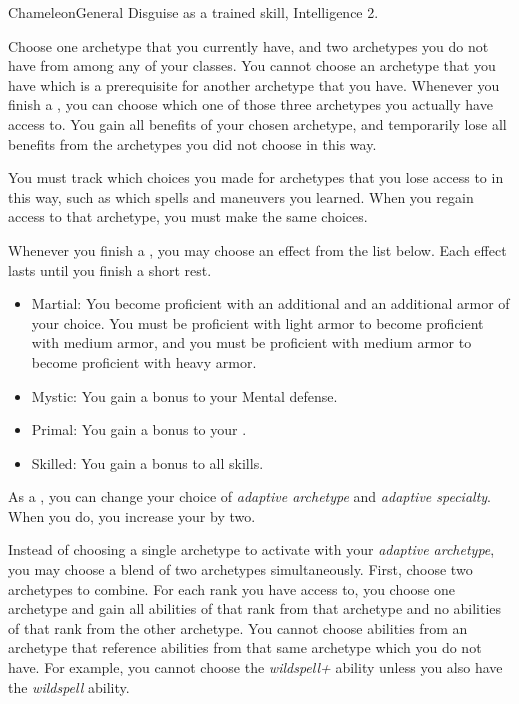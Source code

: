     \begin{feat}{Chameleon}{General}
        \featpre Disguise as a trained skill, Intelligence 2.

         Choose one archetype that you currently have, and two archetypes you do not have from among any of your classes.
        You cannot choose an archetype that you have which is a prerequisite for another archetype that you have.
        Whenever you finish a , you can choose which one of those three archetypes you actually have access to.
        You gain all benefits of your chosen archetype, and temporarily lose all benefits from the archetypes you did not choose in this way.

        You must track which choices you made for archetypes that you lose access to in this way, such as which spells and maneuvers you learned.
        When you regain access to that archetype, you must make the same choices.

         Whenever you finish a , you may choose an effect from the list below.
        Each effect lasts until you finish a short rest.
        \begin{itemize}
            \item Martial: You become proficient with an additional  and an additional armor  of your choice.
                You must be proficient with light armor to become proficient with medium armor, and you must be proficient with medium armor to become proficient with heavy armor.
            \item Mystic: You gain a  bonus to your Mental defense.
            \item Primal: You gain a  bonus to your .
            \item Skilled: You gain a  bonus to all skills.
        \end{itemize}

         As a , you can change your choice of \textit{adaptive archetype} and \textit{adaptive specialty}.
        When you do, you increase your  by two.

         Instead of choosing a single archetype to activate with your \textit{adaptive archetype}, you may choose a blend of two archetypes simultaneously.
        First, choose two archetypes to combine.
        For each rank you have access to, you choose one archetype and gain all abilities of that rank from that archetype and no abilities of that rank from the other archetype.
        You cannot choose abilities from an archetype that reference abilities from that same archetype which you do not have.
        For example, you cannot choose the \textit{wildspell+} ability unless you also have the \textit{wildspell} ability.


\end{feat}
